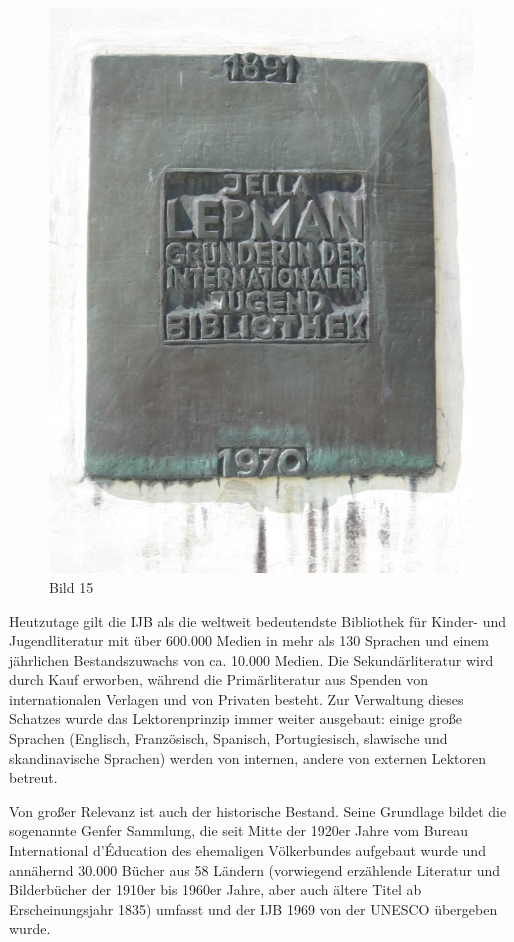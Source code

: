 \documentclass[a4paper,
fontsize=11pt,
oneside,
numbers=noperiodatend,
parskip=half-,
bibliography=totoc,
final
]{scrartcl}
\begin{document}
\begin{figure}[htbp]
\centering
\includegraphics{img/Bild15.jpg}
\caption{Bild 15}
\end{figure}

Heutzutage gilt die IJB als die weltweit bedeutendste Bibliothek für
Kinder- und Jugendliteratur mit über 600.000 Medien in mehr als 130
Sprachen und einem jährlichen Bestandszuwachs von ca. 10.000 Medien. Die
Sekundärliteratur wird durch Kauf erworben, während die Primärliteratur
aus Spenden von internationalen Verlagen und von Privaten besteht. Zur
Verwaltung dieses Schatzes wurde das Lektorenprinzip immer weiter
ausgebaut: einige große Sprachen (Englisch, Französisch, Spanisch,
Portugiesisch, slawische und skandinavische Sprachen) werden von
internen, andere von externen Lektoren betreut.~

Von großer Relevanz ist auch der historische Bestand. Seine Grundlage
bildet die sogenannte Genfer Sammlung, die seit Mitte der 1920er Jahre
vom Bureau International d'Éducation des ehemaligen Völkerbundes
aufgebaut wurde und annähernd 30.000 Bücher aus 58 Ländern (vorwiegend
erzählende Literatur und Bilderbücher der 1910er bis 1960er Jahre, aber
auch ältere Titel ab Erscheinungsjahr 1835) umfasst und der IJB 1969 von
der UNESCO übergeben wurde.
\end{document}
